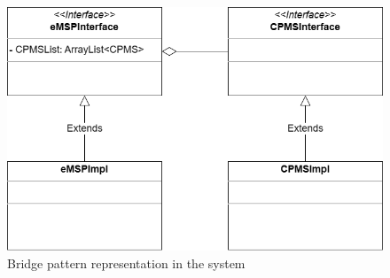 \begin{figure}[!h]
    \begin{center}
        \includegraphics[keepaspectratio, width=12cm]{Graphics/DD-bridge-pattern.drawio.png}
        \caption{Bridge pattern representation in the system}
        \label{fig:bridge-pattern}
    \end{center}
\end{figure}

